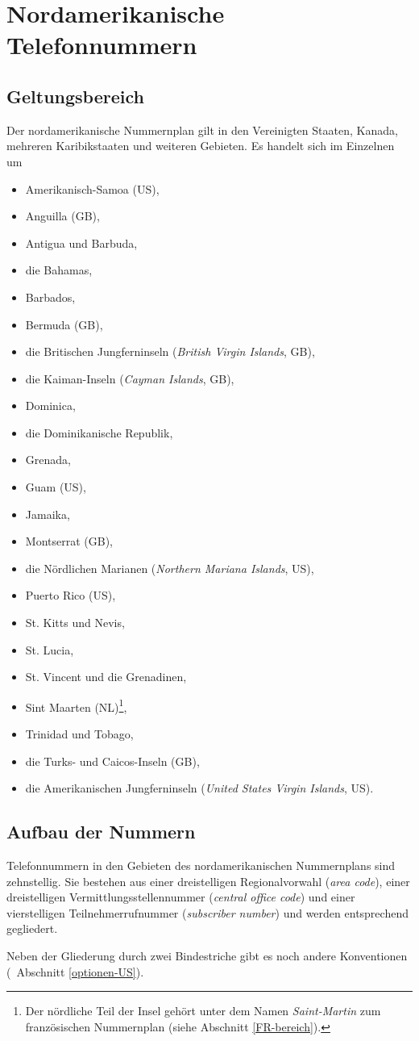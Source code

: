 \documentclass[numbers=noenddot]{scrreprt}
\newcommand\Abschnittsliteratur[1]{\bgroup
\small
\raggedright
\printbibliography[heading=subbibnumbered,keyword=#1]
\egroup}
\newcommand\UeberschriftGeltungsbereich{\section{Geltungsbereich}}
\newcommand\UeberschriftAufbau{\section{Aufbau der Nummern}}
\newcommand*\vglAbschnitt[1]{(\cf\ Abschnitt \ref{#1})}
\newcommand*\sieheAbschnitt[1]{(siehe Abschnitt \ref{#1})}
\begin{document}
\Abschnittsliteratur{british}

\chapter{Nordamerikanische Telefonnummern} \label{US}
\nocite{wikipedia-conventions-old}
\UeberschriftGeltungsbereich \label{US-bereich}
Der nordamerikanische Nummernplan
\cite{wikipedia-NANP}
gilt in den Vereinigten Staaten, Kanada, mehreren Karibikstaaten und weiteren Gebieten. Es handelt sich im Einzelnen um
\begin{itemize}
\item Amerikanisch-Samoa (US),
\item Anguilla (GB),
\item Antigua und Barbuda,
\item die Bahamas,
\item Barbados,
\item Bermuda (GB),
\item die Britischen Jungferninseln (\emph{British Virgin Islands}, GB),
\item die Kaiman-Inseln (\emph{Cayman Islands}, GB),
\item Dominica,
\item die Dominikanische Republik,
\item Grenada,
\item Guam (US),
\item Jamaika,
\item Montserrat (GB),
\item die Nördlichen Marianen (\emph{Northern Mariana Islands}, US),
\item Puerto Rico (US),
\item St. Kitts und Nevis,
\item St. Lucia,
\item St. Vincent und die Grenadinen,
\item Sint Maarten (NL)\footnote{Der nördliche Teil der Insel gehört unter dem Namen \emph{Saint-Martin} zum französischen Nummernplan
\sieheAbschnitt{FR-bereich}.},
\item Trinidad und Tobago,
\item die Turks- und Caicos-Inseln (GB),
\item die Amerikanischen Jungferninseln (\emph{United States Virgin Islands}, US).
\end{itemize}

\UeberschriftAufbau
Telefonnummern in den Gebieten des nordamerikanischen Nummernplans sind zehnstellig. Sie bestehen aus einer dreistelligen Regionalvorwahl (\emph{area code}), einer dreistelligen Vermittlungsstellennummer (\emph{central office code}) und einer vierstelligen Teilnehmerrufnummer (\emph{subscriber number}) und werden entsprechend gegliedert.
\begin{sidebyside}
\end{sidebyside}
Neben der Gliederung durch zwei Bindestriche gibt es noch andere Konventionen
\vglAbschnitt{optionen-US}.
\end{document}
